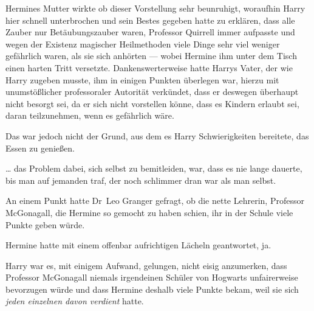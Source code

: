 Hermines Mutter wirkte ob dieser Vorstellung sehr beunruhigt, woraufhin Harry hier schnell unterbrochen und sein Bestes gegeben hatte zu erklären, dass alle Zauber nur Betäubungszauber waren, Professor Quirrell immer aufpasste und wegen der Existenz magischer Heilmethoden viele Dinge sehr viel weniger gefährlich waren, als sie sich anhörten — wobei Hermine ihm unter dem Tisch einen harten Tritt versetzte. Dankenswerterweise hatte Harrys Vater, der wie Harry zugeben musste, ihm in einigen Punkten überlegen war, hierzu mit unumstößlicher professoraler Autorität verkündet, dass er deswegen überhaupt nicht besorgt sei, da er sich nicht vorstellen könne, dass es Kindern erlaubt sei, daran teilzunehmen, wenn es gefährlich wäre.

Das war jedoch nicht der Grund, aus dem es Harry Schwierigkeiten bereitete, das Essen zu genießen.

… das Problem dabei, sich selbst zu bemitleiden, war, dass es nie lange dauerte, bis man auf jemanden traf, der noch schlimmer dran war als man selbst.

An einem Punkt hatte Dr~Leo Granger gefragt, ob die nette Lehrerin, Professor McGonagall, die Hermine so gemocht zu haben schien, ihr in der Schule viele Punkte geben würde.

Hermine hatte mit einem offenbar aufrichtigen Lächeln geantwortet, ja.

Harry war es, mit einigem Aufwand, gelungen, nicht eisig anzumerken, dass Professor McGonagall niemals irgendeinen Schüler von Hogwarts unfairerweise bevorzugen würde und dass Hermine deshalb viele Punkte bekam, weil sie sich \emph{jeden einzelnen davon verdient} hatte.

